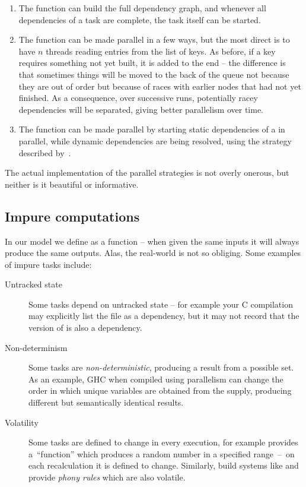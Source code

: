 \begin{enumerate}
\item The  function can build the full dependency graph, and
whenever all dependencies of a task are complete, the task itself can be started.

\item The  function can be made parallel in a few ways, but the
most direct is to have $n$ threads reading entries from the list of keys. As
before, if a key requires something not yet built, it is added to the end -- the
difference is that sometimes things will be moved to the back of the queue not
because they are out of order but because of races with earlier nodes that had
not yet finished. As a consequence, over successive runs, potentially racey
dependencies will be separated, giving better parallelism over time.

\item The  function can be made parallel by starting static
dependencies of a  in parallel, while dynamic dependencies are being
resolved, using the strategy described by~\citet{marlow2014haxl}.
\end{enumerate}

The actual implementation of the parallel strategies is not overly onerous,
but neither is it beautiful or informative.

\subsection{Impure computations}\label{sec-non-determinism}

In our model we define  as a function -- when given the same inputs it
will always produce the same outputs. Alas, the real-world is not so obliging.
Some examples of impure tasks include:

\begin{description}
\item[Untracked state] Some tasks depend on untracked state -- for example
your C compilation may explicitly list the  file as a dependency,
but it may not record that the version of  is also a dependency.

\item[Non-determinism] Some tasks are \emph{non-deterministic}, producing a
result from a possible set. As an example, GHC when compiled using parallelism
can change the order in which unique variables are obtained from the supply,
producing different but semantically identical results.

\item[Volatility] Some tasks are defined to change in every execution, for
example \Excel provides a~``function''  which produces a random
number in a specified range~--~on each recalculation it is defined to change.
Similarly, build systems like \Make and \Shake provide \emph{phony rules} which
are also volatile.
\end{description}

